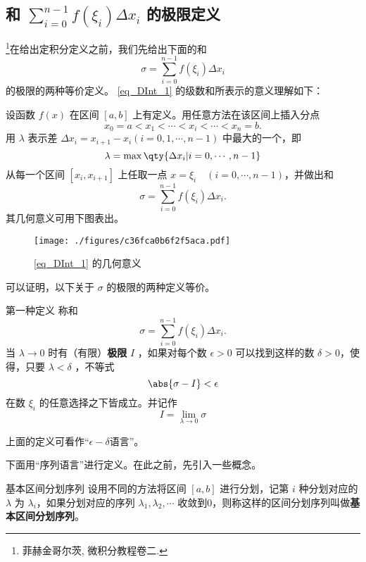 
\subsection{和 $\sum\limits_{i=0}^{n-1}f(\xi_i)\Delta x_i$ 的极限定义}
\footnote{菲赫金哥尔茨, 微积分教程卷二.}在给出定积分定义之前，我们先给出下面的和
\begin{equation}\label{eq_DInt_1}
\sigma=\sum_{i=0}^{n-1}f(\xi_i)\Delta x_i
\end{equation}
的极限的两种等价定义。
\autoref{eq_DInt_1} 的级数和所表示的意义理解如下：

设函数 $f(x)$ 在区间 $[a,b]$ 上有定义。用任意方法在该区间上插入分点
\begin{equation}
x_0=a<x_1<\cdots<x_i<\cdots<x_n=b.
\end{equation}
用 $\lambda$ 表示差 $\Delta x_i=x_{i+1}-x_i(i=0,1,\cdots,n-1)$ 中最大的一个，即
\begin{equation}
\lambda=\max\qty{\Delta x_i|i=0,\cdots,n-1}
\end{equation}
从每一个区间 $[x_i,x_{i+1}]$ 上任取一点 $x=\xi_i\quad (i=0,\cdots,n-1)$，并做出和
\begin{equation}
\sigma=\sum_{i=0}^{n-1}f(\xi_i)\Delta x_i.
\end{equation}
其几何意义可用下图表出。
\begin{figure}[ht]
\centering
\texttt{[image: ./figures/c36fca0b6f2f5aca.pdf]}
\caption{\autoref{eq_DInt_1} 的几何意义} \label{fig_DInt1}
\end{figure}
可以证明，以下关于 $\sigma$ 的极限的两种定义等价。
\begin{definition}{第一种定义}\label{def_DInt_1}
称和
\begin{equation}
\sigma=\sum_{i=0}^{n-1}f(\xi_i)\Delta x_i.
\end{equation}
当 $\lambda\rightarrow0$ 时有（有限）\textbf{极限} $I$ ，如果对每个数 $\epsilon>0$ 可以找到这样的数 $\delta>0$，使得，只要 $\lambda<\delta$ ，不等式
\begin{equation}
\abs{\sigma-I}<\epsilon
\end{equation}
在数 $\xi_i$ 的任意选择之下皆成立。并记作
\begin{equation}
I=\lim_{\lambda\rightarrow0}\sigma
\end{equation}
\end{definition}
上面的定义可看作“$\epsilon-\delta$语言”。 

下面用“序列语言”进行定义。在此之前，先引入一些概念。
\begin{definition}{基本区间分划序列}\label{def_DInt_2}
设用不同的方法将区间 $[a,b]$ 进行分划，记第 $i$ 种分划对应的 $\lambda$ 为 $\lambda_i$，如果分划对应的序列 $\lambda_1,\lambda_2,\cdots$ 收敛到0，则称这样的区间分划序列叫做\textbf{基本区间分划序列}。
\end{definition}

